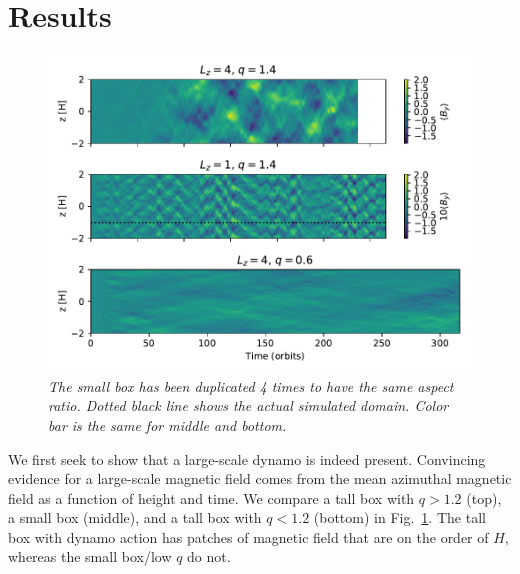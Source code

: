 \documentclass{epsconf}
\begin{document}
\section{Results}
\begin{figure}
\vspace{-1cm} \begin{center}
\includegraphics[width=\linewidth]{fig_xyazte_butterfly_compare_qz.pdf}
\caption{\it \small The small box has been duplicated 4 times to have the same aspect ratio. Dotted black line shows the actual simulated domain. Color bar is the same for middle and bottom.}
\label{fig:butterfly}
\end{center} 
\vspace{-1cm}
\end{figure}%
We first seek to show that a large-scale dynamo is indeed present. Convincing evidence for a large-scale magnetic field comes from the mean azimuthal magnetic field as a function of height and time. We compare a tall box with $q>1.2$ (top), a small box (middle), and a tall box with $q<1.2$ (bottom) in Fig.~\ref{fig:butterfly}. The tall box with dynamo action has patches of magnetic field that are on the order of $H$, whereas the small box/low $q$ do not.
\end{document}
